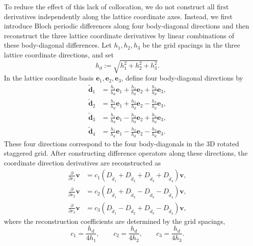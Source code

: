 \documentclass[11pt,oneside]{article}
\numberwithin{equation}{section}
\theoremstyle{plain}
\theoremstyle{remark}
\begin{document}
To reduce the effect of this lack of collocation, we do not construct all first derivatives independently along the lattice coordinate axes. Instead, we first introduce Bloch periodic differences along four body-diagonal directions and then reconstruct the three lattice coordinate derivatives by linear combinations of these body-diagonal differences. Let \(h_1,h_2,h_3\) be the grid spacings in the three lattice coordinate directions, and set
\[
h_d:=\sqrt{h_1^2+h_2^2+h_3^2}.
\]
In the lattice coordinate basis \(\mathbf e_1,\mathbf e_2,\mathbf e_3\), define four body-diagonal directions by
\begin{equation}\label{eq:d_tilde_3d_main}
\begin{aligned}
\widetilde{\mathbf d}_1&=\frac{h_1}{h_d}\mathbf e_1+\frac{h_2}{h_d}\mathbf e_2+\frac{h_3}{h_d}\mathbf e_3,\\
\widetilde{\mathbf d}_2&=\frac{h_1}{h_d}\mathbf e_1+\frac{h_2}{h_d}\mathbf e_2-\frac{h_3}{h_d}\mathbf e_3,\\
\widetilde{\mathbf d}_3&=\frac{h_1}{h_d}\mathbf e_1-\frac{h_2}{h_d}\mathbf e_2+\frac{h_3}{h_d}\mathbf e_3,\\
\widetilde{\mathbf d}_4&=\frac{h_1}{h_d}\mathbf e_1-\frac{h_2}{h_d}\mathbf e_2-\frac{h_3}{h_d}\mathbf e_3.
\end{aligned}
\end{equation}
These four directions correspond to the four body-diagonals in the 3D rotated staggered grid. After constructing difference operators along these directions, the coordinate direction derivatives are reconstructed as
\begin{equation}\label{eq:3d_deriv_recon_main}
\begin{aligned}
\frac{\partial}{\partial r_1}\bm v
&=
c_1\left(D_{\widetilde d_1}+D_{\widetilde d_2}+D_{\widetilde d_3}+D_{\widetilde d_4}\right)\bm v,\\
\frac{\partial}{\partial r_2}\bm v
&=
c_2\left(D_{\widetilde d_1}+D_{\widetilde d_2}-D_{\widetilde d_3}-D_{\widetilde d_4}\right)\bm v,\\
\frac{\partial}{\partial r_3}\bm v
&=
c_3\left(D_{\widetilde d_1}-D_{\widetilde d_2}+D_{\widetilde d_3}-D_{\widetilde d_4}\right)\bm v,
\end{aligned}
\end{equation}
where the reconstruction coefficients are determined by the grid spacings,
\begin{equation}\label{eq:ci_recon_main}
c_1=\frac{h_d}{4h_1},\qquad
c_2=\frac{h_d}{4h_2},\qquad
c_3=\frac{h_d}{4h_3}.
\end{equation}
\end{document}
